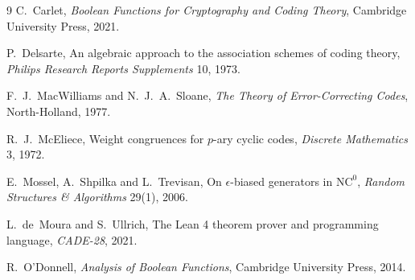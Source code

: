 \documentclass[11pt]{article}
\theoremstyle{definition}
\theoremstyle{remark}
\begin{document}
{\small
\begin{thebibliography}{9}
C.~Carlet, \emph{Boolean Functions for Cryptography and Coding Theory},
Cambridge University Press, 2021.

P.~Delsarte, An algebraic approach to the association schemes of coding theory,
\emph{Philips Research Reports Supplements} 10, 1973.

F.~J.~MacWilliams and N.~J.~A.~Sloane, \emph{The Theory of Error-Correcting
Codes}, North-Holland, 1977.

R.~J.~McEliece, Weight congruences for $p$-ary cyclic codes,
\emph{Discrete Mathematics} 3, 1972.

E.~Mossel, A.~Shpilka and L.~Trevisan, On $\epsilon$-biased generators in
$\mathrm{NC}^0$, \emph{Random Structures \& Algorithms} 29(1), 2006.

L.~de~Moura and S.~Ullrich, The Lean 4 theorem prover and programming language,
\emph{CADE-28}, 2021.

R.~O'Donnell, \emph{Analysis of Boolean Functions}, Cambridge University Press,
2014.
\end{thebibliography}
}
\end{document}
